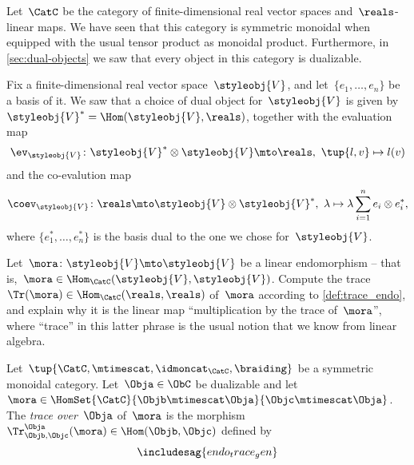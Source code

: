 \begin{gradedexercise}
    \label{ex:LinearAlgebraTrace}
    Let~$\CatC$ be the category of finite-dimensional real vector spaces and~$\reals$-linear maps.
    We have seen that this category is symmetric monoidal when equipped with the usual tensor product as monoidal product.
    Furthermore, in \cref{sec:dual-objects} we saw that every object in this category is dualizable.

    Fix a finite-dimensional real vector space~$\styleobj{V}$, and let~$\{e_1,\ldots,e_n \}$ be a basis of it.
    We saw that a choice of dual object for~$\styleobj{V}$ is given by~$\styleobj{V}^* = \Hom(\styleobj{V}, \reals)$, together with the evaluation map
    \begin{equation}
        \ev_\styleobj{V}  \colon \styleobj{V}^* \otimes \styleobj{V}  \mto \reals, \ \tup{l, v} \mapsto l(v)
    \end{equation}
    and the co-evalution map
    \begin{equation}
        \coev_\styleobj{V}  \colon \reals \mto \styleobj{V}  \otimes \styleobj{V}^*, \ \lambda \mapsto \lambda \sum_{i=1}^n e_i \otimes e_i^*,
    \end{equation}
    where $\{e_1^*,\ldots,e_n^* \}$ is the basis dual to the one we chose for~$\styleobj{V}$.

    Let~$\mora\colon \styleobj{V} \mto \styleobj{V}$ be a linear endomorphism -- that is,~$\mora \in \Hom_\CatC(\styleobj{V}, \styleobj{V})$.
    Compute the trace~$\Tr(\mora) \in \Hom_\CatC(\reals, \reals)$ of~$\mora$ according to \cref{def:trace_endo}, and explain why it is the linear map ``multiplication by the trace of~$\mora$'', where ``trace'' in this latter phrase is the usual notion that we know from linear algebra.
\end{gradedexercise}



\begin{ctdefinition}
    \label{def:trace_gen_endo}
    Let~$\tup{\CatC,\mtimescat,\idmoncat_{\CatC}, \braiding}$ be a symmetric monoidal category.
    Let~$\Obja \in \ObC$ be dualizable and let~$\mora \in \HomSet{\CatC}{\Objb \mtimescat \Obja}{\Objc \mtimescat \Obja}$.
    The \emph{trace over}~$\Obja$ of~$\mora$ is the morphism~$\Tr_{\Objb, \Objc}^\Obja (\mora) \in \Hom(\Objb, \Objc)$ defined by
    \begin{equation}
        \includesag{endo_trace_gen}
    \end{equation}
\end{ctdefinition}

